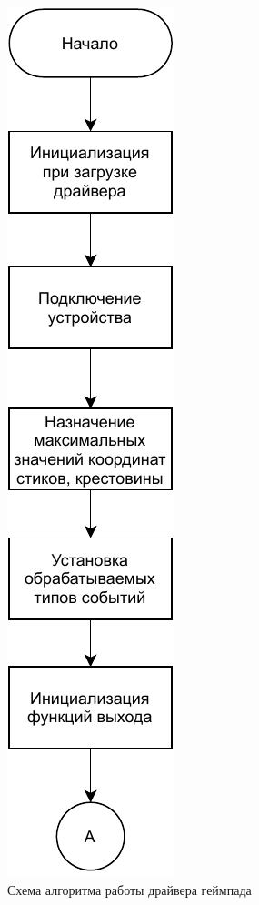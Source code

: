 \begin{figure}[h!]
	\centering
	\includegraphics[scale=1.5]{img/driver-work1.pdf}
	\caption{Схема алгоритма работы драйвера геймпада}
	\label{driver-work1}
\end{figure}
\newpage


